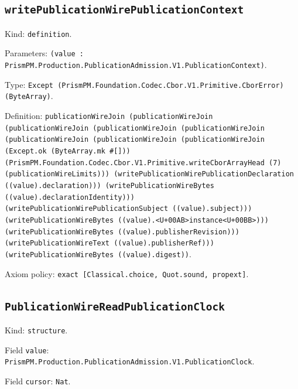\documentclass[11pt]{article}
\begin{document}
\subsection*{\texttt{writePublicationWirePublicationContext}}
\noindent Kind: \texttt{definition}.\par
\noindent Parameters: \texttt{(value : PrismPM.Production.PublicationAdmission.V1.PublicationContext)}.\par
\noindent Type: \texttt{Except (PrismPM.Foundation.Codec.Cbor.V1.Primitive.CborError) (ByteArray)}.\par
\noindent Definition: \texttt{publicationWireJoin (publicationWireJoin (publicationWireJoin (publicationWireJoin (publicationWireJoin (publicationWireJoin (publicationWireJoin (publicationWireJoin (Except.ok (ByteArray.mk \#[])) (PrismPM.Foundation.Codec.Cbor.V1.Primitive.writeCborArrayHead (7) (publicationWireLimits))) (writePublicationWirePublicationDeclaration ((value).declaration))) (writePublicationWireBytes ((value).declarationIdentity))) (writePublicationWirePublicationSubject ((value).subject))) (writePublicationWireBytes ((value).<U+00AB>instance<U+00BB>))) (writePublicationWireBytes ((value).publisherRevision))) (writePublicationWireText ((value).publisherRef))) (writePublicationWireBytes ((value).digest))}.\par
\noindent Axiom policy: \texttt{exact [Classical.choice, Quot.sound, propext]}.\par
\subsection*{\texttt{PublicationWireReadPublicationClock}}
\noindent Kind: \texttt{structure}.\par
\noindent Field \texttt{value}: \texttt{PrismPM.Production.PublicationAdmission.V1.PublicationClock}.\par
\noindent Field \texttt{cursor}: \texttt{Nat}.\par
\end{document}
